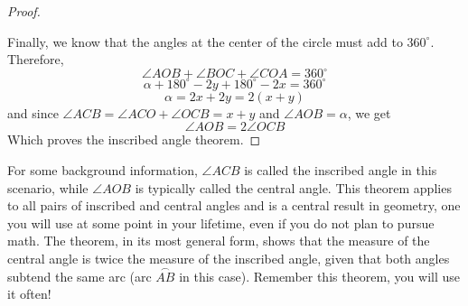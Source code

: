 \begin{proof}
\begin{center}
\end{center}
Finally, we know that the angles at the center of the circle must add to $360^{\circ}$. Therefore,
\[
\angle AOB + \angle BOC + \angle COA = 360^{\circ}
\]
\[
\alpha + 180^{\circ} - 2y + 180^{\circ} - 2x = 360^{\circ}
\]
\[
\alpha = 2x + 2y = 2(x+y)
\]
and since $\angle ACB = \angle ACO + \angle OCB = x + y$ and $\angle AOB = \alpha$, we get
\[
\angle AOB = 2 \angle OCB
\]
Which proves the inscribed angle theorem. 
\end{proof}

For some background information, $\angle ACB$ is called the inscribed angle in this scenario, while $\angle AOB$ is typically called the central angle. This theorem applies to all pairs of inscribed and central angles and is a central result in geometry, one you will use at some point in your lifetime, even if you do not plan to pursue math. The theorem, in its most general form, shows that the measure of the central angle is twice the measure of the inscribed angle, given that both angles subtend the same arc (arc $\overset{\frown}{AB}$ in this case). Remember this theorem, you will use it often!

